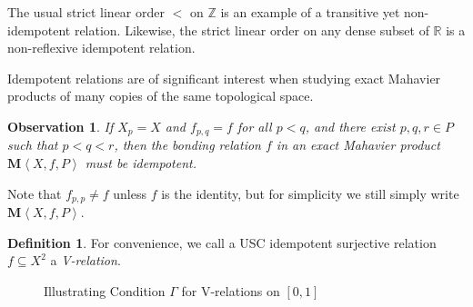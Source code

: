 \documentclass{article}
\newcommand{\term}{\textit}
\newcommand{\tuple}[1]{\left\langle{#1}\right\rangle}
\newcommand{\maProd}[1]{{\mathbf{M}}\tuple{#1}}
\theoremstyle{plain}
\newtheorem{observation}[theorem]{Observation}
\theoremstyle{definition}
\newtheorem{definition}[theorem]{Definition}
\theoremstyle{remark}
\begin{document}
The usual strict linear order \(<\) on \(\mathbb{Z}\) is
an example of a transitive yet non-idempotent relation.
Likewise, the strict linear order on any dense subset of \(\mathbb R\)
is a non-reflexive idempotent relation.

Idempotent relations are of significant interest
when studying exact Mahavier products of many copies of the same topological space.

\begin{observation}
If \(X_p=X\) and \(f_{p,q}=f\) for all \(p<q\),
and there exist \(p,q,r\in P\) such that \(p<q<r\), 
then the bonding relation \(f\) 
in an exact Mahavier product \(\maProd{X,f,P}\) must be idempotent. 
\end{observation}

Note that \(f_{p,p}\not=f\) unless \(f\) is the identity, but for
simplicity we still simply write \(\maProd{X,f,P}\).

\begin{definition}
For convenience, we call a USC idempotent surjective relation 
\(f \subseteq X^2\) a \term{V-relation}. 
\end{definition}

\begin{figure}
\begin{center}
\end{center}
\caption{Illustrating Condition \(\Gamma\) for V-relations on \([0,1]\)}
\label{VRelation}
\end{figure}
\end{document}
